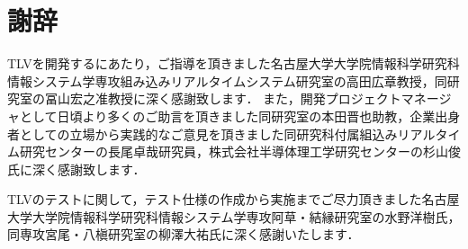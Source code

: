 \chapter*{謝辞}

TLVを開発するにあたり，ご指導を頂きました名古屋大学大学院情報科学研究科情報システム学専攻組み込みリアルタイムシステム研究室の高田広章教授，同研究室の冨山宏之准教授に深く感謝致します．
また，開発プロジェクトマネージャとして日頃より多くのご助言を頂きました同研究室の本田晋也助教，企業出身者としての立場から実践的なご意見を頂きました同研究科付属組込みリアルタイム研究センターの長尾卓哉研究員，株式会社半導体理工学研究センターの杉山俊氏に深く感謝致します．

TLVのテストに関して，テスト仕様の作成から実施までご尽力頂きました名古屋大学大学院情報科学研究科情報システム学専攻阿草・結縁研究室の水野洋樹氏，同専攻宮尾・八槇研究室の柳澤大祐氏に深く感謝いたします．
